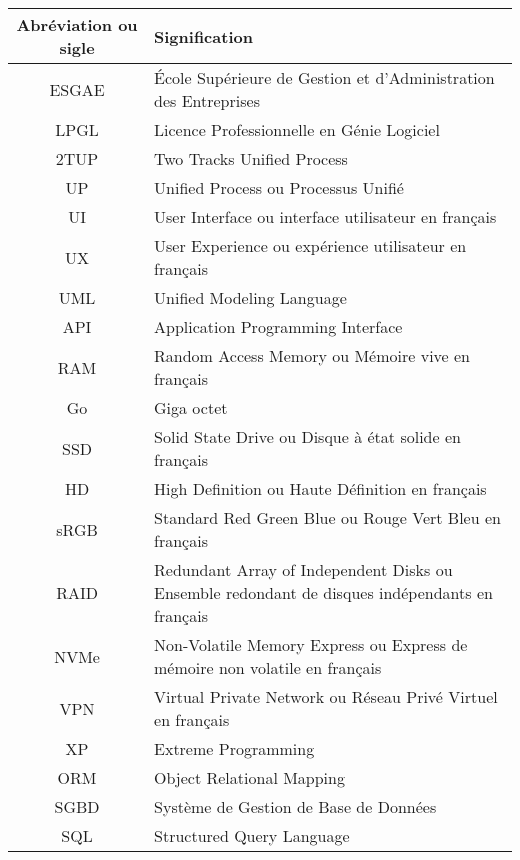 \begin{table}[h!]
    \centering
    \begin{tabular}{|c|m{11cm}|}
        \hline
        \textbf{Abréviation ou sigle} & \textbf{Signification} \\
        \hline
        ESGAE & École Supérieure de Gestion et d’Administration des Entreprises \\
        \hline
        LPGL & Licence Professionnelle en Génie Logiciel \\
        \hline
        2TUP & Two Tracks Unified Process \\
        \hline
        UP & Unified Process ou Processus Unifié \\
        \hline
        UI & User Interface ou interface utilisateur en français \\
        \hline
        UX & User Experience ou expérience utilisateur en français \\
        \hline
        UML & Unified Modeling Language \\
        \hline
        API & Application Programming Interface \\
        \hline
        RAM & Random Access Memory ou Mémoire vive en français \\
        \hline
        Go & Giga octet \\
        \hline
        SSD & Solid State Drive ou Disque à état solide en français \\
        \hline
        HD & High Definition ou Haute Définition en français \\
        \hline
        sRGB & Standard Red Green Blue ou Rouge Vert Bleu en français \\
        \hline
        RAID & Redundant Array of Independent Disks ou Ensemble redondant de disques indépendants en français \\
        \hline
        NVMe & Non-Volatile Memory Express ou Express de mémoire non volatile en français \\
        \hline
        VPN & Virtual Private Network ou Réseau Privé Virtuel en français \\
        \hline
        XP & Extreme Programming \\
        \hline
        ORM & Object Relational Mapping \\
        \hline
        SGBD & Système de Gestion de Base de Données \\
        \hline
        SQL & Structured Query Language \\

\end{tabular}
\end{table}
